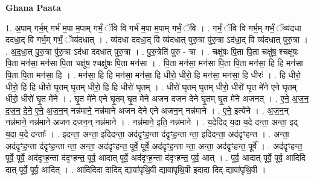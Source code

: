 \documentclass[17pt]{extarticle}
\begin{document}
\textbf{Ghana Paata } \newline

1. अ॒पाम् गर्भ॒म् गर्भ॑ म॒पा म॒पाम् गर्भं॒ ॅवि वि गर्भ॑ म॒पा म॒पाम् गर्भं॒ ॅवि । . गर्भं॒ ॅवि वि गर्भ॒म् गर्भं॒ ॅव्य॑दधा ददधा॒द् वि गर्भ॒म् गर्भं॒ ॅव्य॑दधात् । . व्य॑दधा ददधा॒द् वि व्य॑दधात् पुरु॒त्रा पु॑रु॒त्रा ऽद॑धा॒द् वि व्य॑दधात् पुरु॒त्रा । . अ॒द॒धा॒त् पु॒रु॒त्रा पु॑रु॒त्रा ऽद॑धा ददधात् पुरु॒त्रा । . पु॒रु॒त्रेति॑ पुरु - त्रा । . चक्षु॑षः पि॒ता पि॒ता चक्षु॑ष॒ श्चक्षु॑षः पि॒ता मन॑सा॒ मन॑सा पि॒ता चक्षु॑ष॒ श्चक्षु॑षः पि॒ता मन॑सा । . पि॒ता मन॑सा॒ मन॑सा पि॒ता पि॒ता मन॑सा॒ हि हि मन॑सा पि॒ता पि॒ता मन॑सा॒ हि । . मन॑सा॒ हि हि मन॑सा॒ मन॑सा॒ हि धीरो॒ धीरो॒ हि मन॑सा॒ मन॑सा॒ हि धीरः॑ । . हि धीरो॒ धीरो॒ हि हि धीरो॑ घृ॒तम् घृ॒तम् धीरो॒ हि हि धीरो॑ घृ॒तम् । . धीरो॑ घृ॒तम् घृ॒तम् धीरो॒ धीरो॑ घृ॒त मे॑ने एने घृ॒तम् धीरो॒ धीरो॑ घृ॒त मे॑ने । . घृ॒त मे॑ने एने घृ॒तम् घृ॒त मे॑ने अजन दजन देने घृ॒तम् घृ॒त मे॑ने अजनत् । . ए॒ने॒ अ॒ज॒न॒ द॒ज॒न॒ दे॒ने॒ ए॒ने॒ अ॒ज॒न॒न् नन्न॑माने॒ नन्न॑माने अजन देने एने अजन॒न् नन्न॑माने । . ए॒ने॒ इत्ये॑ने । . अ॒ज॒न॒न् नन्न॑माने॒ नन्न॑माने अजन दजन॒न् नन्न॑माने । . नन्न॑माने॒ इति॒ नन्न॑माने । . य॒देदिद् य॒दा य॒दे दन्ता॒ अन्ता॒ इद् य॒दा य॒दे दन्ताः᳚ । . इदन्ता॒ अन्ता॒ इदिदन्ता॒ अद॑दृꣳह॒न्ता द॑दृꣳह॒न्ता न्ता॒ इदिदन्ता॒ अद॑दृꣳहन्त । . अन्ता॒ अद॑दृꣳह॒न्ता द॑दृꣳह॒न्ता न्ता॒ अन्ता॒ अद॑दृꣳहन्त॒ पूर्वे॒ पूर्वे॒ अद॑दृꣳह॒न्ता न्ता॒ अन्ता॒ अद॑दृꣳहन्त॒ पूर्वे᳚ । . अद॑दृꣳहन्त॒ पूर्वे॒ पूर्वे॒ अद॑दृꣳह॒न्ता द॑दृꣳहन्त॒ पूर्व॒ आदात् पूर्वे॒ अद॑दृꣳह॒न्ता द॑दृꣳहन्त॒ पूर्व॒ आत् । . पूर्व॒ आदात् पूर्वे॒ पूर्व॒ आदिदि दात् पूर्वे॒ पूर्व॒ आदित् । . आदिदिदा दादिद् द्यावा॑पृथि॒वी द्यावा॑पृथि॒वी इदादा दिद् द्यावा॑पृथि॒वी । \newline
\end{document}
